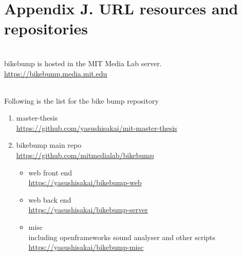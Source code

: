 \chapter{Appendix J. URL resources and repositories}
\label{appj:repo}

\\
bikebump is hosted in the MIT Media Lab server.\\
\url{https://bikebump.media.mit.edu}

\\
Following is the list for the bike bump repository

\begin{enumerate}
    \item master-thesis\\
    \url{https://github.com/yasushisakai/mit-master-thesis}
    \item bikebump main repo\\
    \url{https://github.com/mitmedialab/bikebump}
        \begin{itemize}
            \item web front end\\
            \url{https://yasushisakai/bikebump-web}
            \item web back end\\
            \url{https://yasushisakai/bikebump-server}
            \item misc\\
            including openframeworks sound analyser and other scripts
            \url{https://yasushisakai/bikebump-misc}
        \end{itemize}
\end{enumerate}